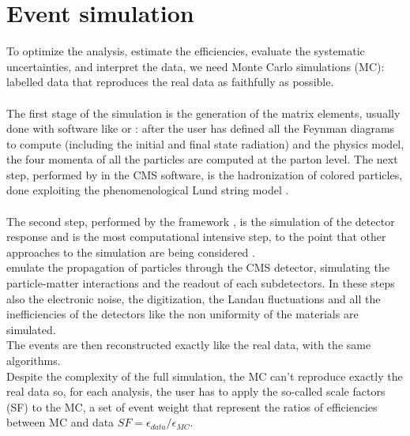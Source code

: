 \section{Event simulation}
To optimize the analysis, estimate the efficiencies, evaluate the systematic uncertainties, and interpret the data, we need Monte Carlo simulations (MC): labelled data that reproduces the real data as faithfully as possible.\\
\\
The first stage of the simulation is the generation of the matrix elements, usually done with software like \MADGRAPH \cite{Alwall2011MadGraphBeyond} or \POWHEG \cite{Alioli2010ABOX}: after the user has defined all the Feynman diagrams to compute (including the initial and final state radiation) and the physics model, the four momenta of all the particles are computed at the parton level.
The next step, performed by \PYTHIA \cite{Sjostrand2006PYTHIAManual} in the CMS software, is the hadronization of colored particles, done exploiting the phenomenological Lund string model \cite{Andersson1983PartonDynamics}.\\
\\
The second step, performed by the \GEANTfour framework \cite{Agostinelli2003GEANT4--aToolkit}, is the simulation of the detector response and is the most computational intensive step, to the point that other approaches to the simulation are being considered \cite{Sekmen2016RecentSimulation,Vaselli2023FlashSimFlow}.\\
\GEANT emulate the propagation of particles through the CMS detector, simulating the particle-matter interactions and the readout of each subdetectors. In these steps also the electronic noise, the digitization, the Landau fluctuations and all the inefficiencies of the detectors like the non uniformity of the materials are simulated.\\
The events are then reconstructed exactly like the real data, with the same algorithms.\\
Despite the complexity of the full simulation, the MC can't reproduce exactly the real data so, for each analysis, the user has to apply the so-called scale factors (SF) to the MC, a set of event weight that represent the ratios of efficiencies between MC and data $SF=\epsilon_{data}/\epsilon_{MC}$.

